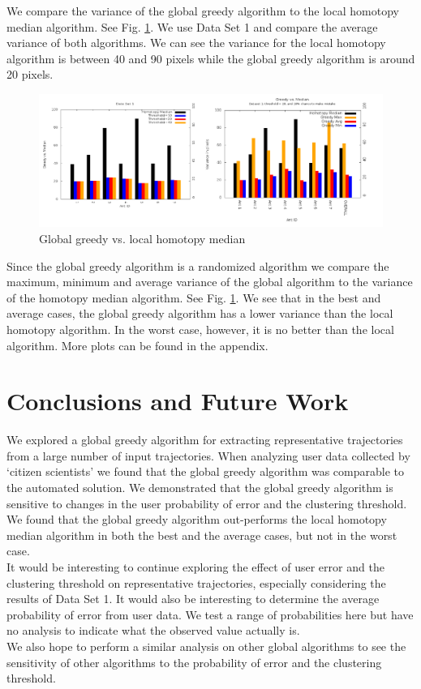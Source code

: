 \documentclass[12pt]{article}
\begin{document}
We compare the variance of the global greedy algorithm to the local homotopy median algorithm. See Fig. \ref{fig:compare}. We use Data Set 1 and compare the average variance of both algorithms. We can see the variance for the local homotopy algorithm is between 40 and 90 pixels while the global greedy algorithm is around 20 pixels.

\begin{figure}[h!]
\centering
\includegraphics[width=6in]{compare.png}
\caption{Global greedy vs. local homotopy median}
\label{fig:compare}
\end{figure}

Since the global greedy algorithm is a randomized algorithm we compare the maximum, minimum and average variance of the global algorithm to the variance of the homotopy median algorithm. See Fig. \ref{fig:compare}.  We see that in the best and average cases, the global greedy algorithm has a lower variance than the local homotopy algorithm. In the worst case, however, it is no better than the local algorithm. More plots can be found in the appendix.


\section{Conclusions and Future Work}
We explored a global greedy algorithm for extracting representative trajectories from a large number of input trajectories. When analyzing user data collected by `citizen scientists' we found that the global greedy algorithm was comparable to the automated solution. We demonstrated that the global greedy algorithm is sensitive to changes in the user probability of error and the clustering threshold. We found that the global greedy algorithm out-performs the local homotopy median algorithm in both the best and the average cases, but not in the worst case. \\
It would be interesting to continue exploring the effect of user error and the clustering threshold on representative trajectories, especially considering the results of Data Set 1. It would also be interesting to determine the average probability of error from user data. We test a range of probabilities here but have no analysis to indicate what the observed value actually is. \\
We also hope to perform a similar analysis on other global algorithms to see the sensitivity of other algorithms to the probability of error and the clustering threshold. 
\end{document}
